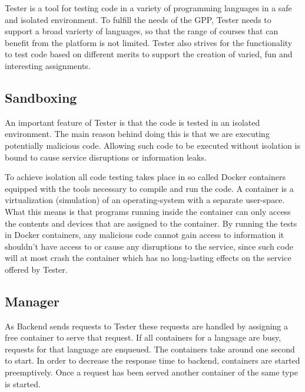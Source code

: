 Tester is a tool for testing code in a variety of programming languages in a safe and isolated environment. To fulfill the needs of the GPP, Tester needs to support a  broad varierty of languages, so that the range of courses that can benefit from the platform is not limited. Tester also strives for the functionality to test code based on different merits to support the creation of varied, fun and interesting assignments.

\subsection{Sandboxing}
An important feature of Tester is that the code is tested in an isolated environment. The main reason behind doing this is that we are executing potentially malicious code. Allowing such code to be executed without isolation is bound to cause service disruptions or information leaks.

To achieve isolation all code testing takes place in so called Docker containers equipped with the tools necessary to compile and run the code. A container is a virtualization (simulation) of an operating-system with a separate user-space. What this means is that programs running inside the container can only access the contents and devices that are assigned to the container. By running the tests in Docker containers, any malicious code cannot gain access to information it shouldn't have access to or cause any disruptions to the service, since such code will at most crash the container which has no long-lasting effects on the service offered by Tester.
\subsection{Manager}

As Backend sends requests to Tester these requests are handled by assigning a free container to serve that request.
If all containers for a language are busy, requests for that language are enqueued. 
The containers take around one second to start. In order to decrease the response time to backend,
containers are started preemptively. Once a request has been served another container of the same type is started.


